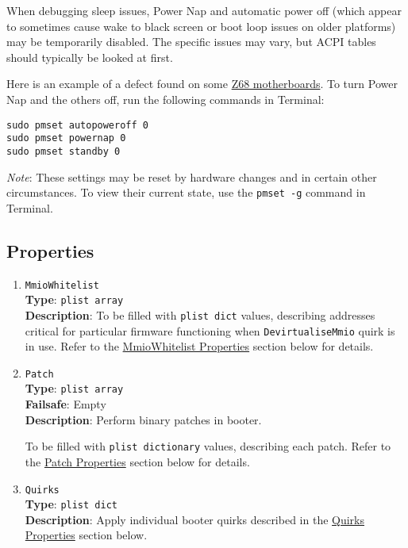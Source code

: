 \documentclass[]{article}
\begin{document}
When debugging sleep issues, Power Nap and automatic power off (which appear to sometimes cause
wake to black screen or boot loop issues on older platforms) may be temporarily disabled.
The specific issues may vary, but ACPI tables should typically be looked at first.

Here is an example of a defect found on some
\href{http://www.insanelymac.com/forum/topic/329624-need-cmos-reset-after-sleep-only-after-login/#entry2534645}{Z68 motherboards}.
To turn Power Nap and the others off, run the following commands in Terminal:
\begin{lstlisting}[label=powernap, style=ocbash]
sudo pmset autopoweroff 0
sudo pmset powernap 0
sudo pmset standby 0
\end{lstlisting}

\emph{Note}: These settings may be reset by hardware changes and in certain other circumstances.
To view their current state, use the \texttt{pmset -g} command in Terminal.

\subsection{Properties}\label{booterprops}

\begin{enumerate}

\item
  \texttt{MmioWhitelist}\\
  \textbf{Type}: \texttt{plist\ array}\\
  \textbf{Description}: To be filled with \texttt{plist\ dict} values,
  describing addresses critical for particular firmware functioning when
  \texttt{DevirtualiseMmio} quirk is in use.
  Refer to the \hyperref[booterpropsmmio]{MmioWhitelist Properties} section below for details.

\item
  \texttt{Patch}\\
  \textbf{Type}: \texttt{plist\ array}\\
  \textbf{Failsafe}: Empty\\
  \textbf{Description}: Perform binary patches in booter.

  To be filled with \texttt{plist\ dictionary} values, describing each
  patch. Refer to the \hyperref[booterpropspatch]{Patch Properties} section below for details.

\item
  \texttt{Quirks}\\
  \textbf{Type}: \texttt{plist\ dict}\\
  \textbf{Description}: Apply individual booter quirks described
  in the \hyperref[booterpropsquirks]{Quirks Properties} section below.

\end{enumerate}
\end{document}
